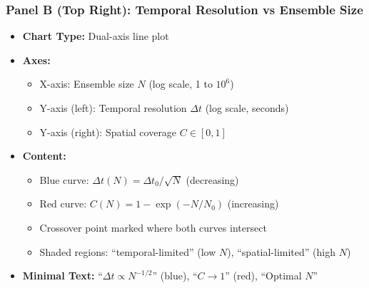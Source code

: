 \subsubsection*{Panel B (Top Right): Temporal Resolution vs Ensemble Size}
\begin{itemize}
\item \textbf{Chart Type:} Dual-axis line plot
\item \textbf{Axes:}
  \begin{itemize}
  \item X-axis: Ensemble size $N$ (log scale, 1 to $10^6$)
  \item Y-axis (left): Temporal resolution $\Delta t$ (log scale, seconds)
  \item Y-axis (right): Spatial coverage $C \in [0,1]$
  \end{itemize}
\item \textbf{Content:}
  \begin{itemize}
  \item Blue curve: $\Delta t(N) = \Delta t_0/\sqrt{N}$ (decreasing)
  \item Red curve: $C(N) = 1 - \exp(-N/N_0)$ (increasing)
  \item Crossover point marked where both curves intersect
  \item Shaded regions: ``temporal-limited'' (low $N$), ``spatial-limited'' (high $N$)
  \end{itemize}
\item \textbf{Minimal Text:} ``$\Delta t \propto N^{-1/2}$'' (blue), ``$C \to 1$'' (red), ``Optimal $N$''
\end{itemize}

